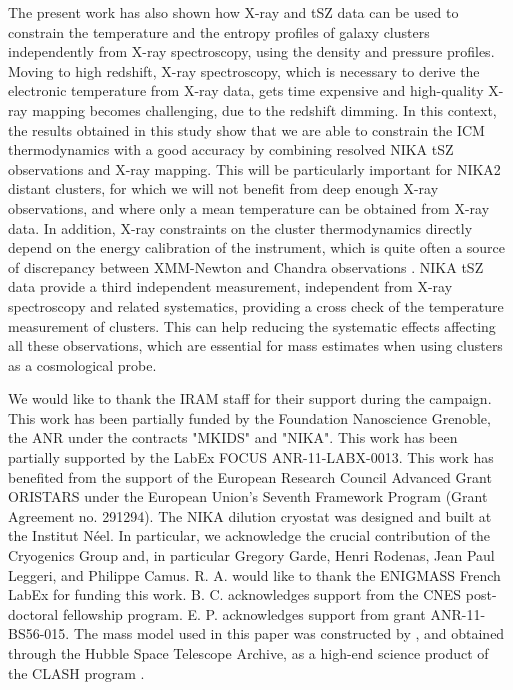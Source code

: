 \documentclass[twocolumn,traditabstract]{aa}
\begin{document}
The present work has also shown how X-ray and tSZ data can be used to constrain the temperature and the entropy profiles of galaxy clusters independently from X-ray spectroscopy, using the density and pressure profiles. Moving to high redshift, X-ray spectroscopy, which is necessary to derive the electronic temperature from X-ray data, gets time expensive and high-quality X-ray mapping becomes challenging, due to the redshift dimming. In this context, the results obtained in this study show that we are able to constrain the ICM thermodynamics with a good accuracy by combining resolved NIKA tSZ observations and X-ray mapping. This will be particularly important for NIKA2 distant clusters, for which we will not benefit from deep enough X-ray observations, and where only a mean temperature can be obtained from X-ray data. In addition, X-ray constraints on the cluster thermodynamics directly depend on the energy calibration of the instrument, which is quite often a source of discrepancy between XMM-Newton and Chandra observations \citep[see for example the recent work of][]{schellenberger2015}. NIKA tSZ data provide a third independent measurement, independent from X-ray spectroscopy and related systematics, providing a cross check of the temperature measurement of clusters. This can help reducing the systematic effects affecting all these observations, which are essential for mass estimates when using clusters as a cosmological probe.

\begin{acknowledgements}
We would like to thank the IRAM staff for their support during the campaign.
This work has been partially funded by the Foundation Nanoscience Grenoble, the ANR under the contracts "MKIDS" and "NIKA". 
This work has been partially supported by the LabEx FOCUS ANR-11-LABX-0013. 
This work has benefited from the support of the European Research Council Advanced Grant ORISTARS under the European Union's Seventh Framework Program (Grant Agreement no. 291294).
The NIKA dilution cryostat was designed and built at the Institut N\'eel. In particular, we acknowledge the crucial contribution of the Cryogenics Group and, in particular Gregory Garde, Henri Rodenas, Jean Paul Leggeri, and Philippe Camus. 
R. A. would like to thank the ENIGMASS French LabEx for funding this work. 
B. C. acknowledges support from the CNES post-doctoral fellowship program. 
E. P. acknowledges support from grant ANR-11-BS56-015. 
The mass model used in this paper was constructed by \cite{zitrin2011}, and obtained through the Hubble Space Telescope Archive, as a high-end science product of the CLASH program \citep{postman2012}.
\end{acknowledgements}


\end{document}
